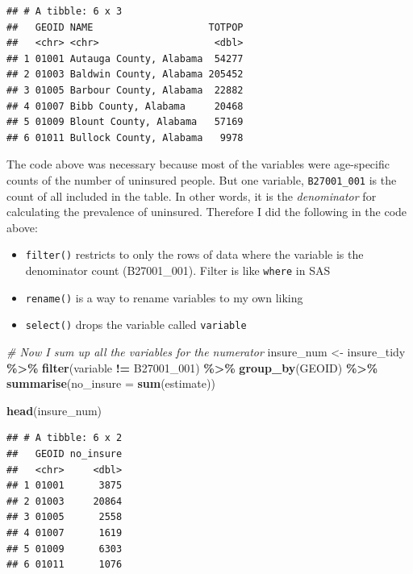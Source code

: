 \documentclass[
]{book}
\newenvironment{Shaded}{\begin{snugshade}}{\end{snugshade}}
\newcommand{\AttributeTok}[1]{\textcolor[rgb]{0.13,0.29,0.53}{#1}}
\newcommand{\CommentTok}[1]{\textcolor[rgb]{0.56,0.35,0.01}{\textit{#1}}}
\newcommand{\FunctionTok}[1]{\textcolor[rgb]{0.13,0.29,0.53}{\textbf{#1}}}
\newcommand{\NormalTok}[1]{#1}
\newcommand{\OtherTok}[1]{\textcolor[rgb]{0.56,0.35,0.01}{#1}}
\newcommand{\SpecialCharTok}[1]{\textcolor[rgb]{0.81,0.36,0.00}{\textbf{#1}}}
\newcommand{\StringTok}[1]{\textcolor[rgb]{0.31,0.60,0.02}{#1}}
\providecommand{\tightlist}{%
  \setlength{\itemsep}{0pt}\setlength{\parskip}{0pt}}
\begin{document}
\begin{verbatim}
## # A tibble: 6 x 3
##   GEOID NAME                    TOTPOP
##   <chr> <chr>                    <dbl>
## 1 01001 Autauga County, Alabama  54277
## 2 01003 Baldwin County, Alabama 205452
## 3 01005 Barbour County, Alabama  22882
## 4 01007 Bibb County, Alabama     20468
## 5 01009 Blount County, Alabama   57169
## 6 01011 Bullock County, Alabama   9978
\end{verbatim}

The code above was necessary because most of the variables were age-specific counts of the number of uninsured people. But one variable, \texttt{B27001\_001} is the count of all included in the table. In other words, it is the \emph{denominator} for calculating the prevalence of uninsured. Therefore I did the following in the code above:

\begin{itemize}
\tightlist
\item
  \texttt{filter()} restricts to only the rows of data where the variable is the denominator count (B27001\_001). Filter is like \texttt{where} in SAS
\item
  \texttt{rename()} is a way to rename variables to my own liking
\item
  \texttt{select()} drops the variable called \texttt{variable}
\end{itemize}

\begin{Shaded}
\begin{Highlighting}[]
\CommentTok{\# Now I sum up all the variables for the numerator}
\NormalTok{insure\_num }\OtherTok{\textless{}{-}}\NormalTok{ insure\_tidy }\SpecialCharTok{\%\textgreater{}\%}
  \FunctionTok{filter}\NormalTok{(variable }\SpecialCharTok{!=} \StringTok{\textquotesingle{}B27001\_001\textquotesingle{}}\NormalTok{) }\SpecialCharTok{\%\textgreater{}\%}
  \FunctionTok{group\_by}\NormalTok{(GEOID) }\SpecialCharTok{\%\textgreater{}\%}
  \FunctionTok{summarise}\NormalTok{(}\AttributeTok{no\_insure =} \FunctionTok{sum}\NormalTok{(estimate))}

\FunctionTok{head}\NormalTok{(insure\_num)}
\end{Highlighting}
\end{Shaded}

\begin{verbatim}
## # A tibble: 6 x 2
##   GEOID no_insure
##   <chr>     <dbl>
## 1 01001      3875
## 2 01003     20864
## 3 01005      2558
## 4 01007      1619
## 5 01009      6303
## 6 01011      1076
\end{verbatim}
\end{document}
